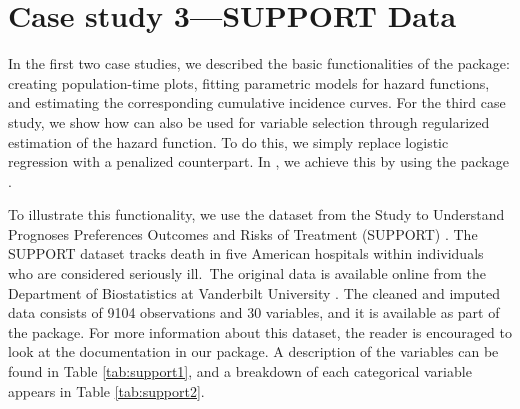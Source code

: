 \documentclass[
]{jss}
\begin{document}
\hypertarget{case-study-3support-data}{%
\section{Case study 3---SUPPORT Data}\label{case-study-3support-data}}

In the first two case studies, we described the basic functionalities of
the  package: creating population-time plots, fitting
parametric models for hazard functions, and estimating the corresponding
cumulative incidence curves. For the third case study, we show how
 can also be used for variable selection through
regularized estimation of the hazard function. To do this, we simply
replace logistic regression with a penalized counterpart. In
, we achieve this by using the  package
\citep{friedman2010jss}.

To illustrate this functionality, we use the dataset from the Study to
Understand Prognoses Preferences Outcomes and Risks of Treatment
(SUPPORT) \citep{knaus1995support}. The SUPPORT dataset tracks death in
five American hospitals within individuals who are considered seriously
ill.~The original data is available online from the Department of
Biostatistics at Vanderbilt University \citep{harrell_2020}. The cleaned
and imputed data consists of 9104 observations and 30 variables, and it
is available as part of the  package. For more information
about this dataset, the reader is encouraged to look at the
documentation in our package. A description of the variables can be
found in Table \ref{tab:support1}, and a breakdown of each categorical
variable appears in Table \ref{tab:support2}.
\end{document}
